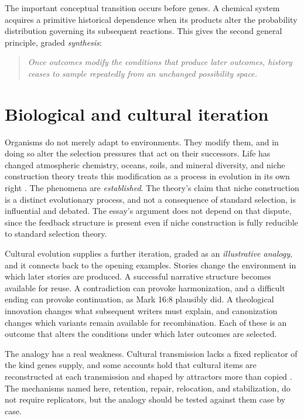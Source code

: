 \documentclass[11pt]{article}
\newenvironment{principle}{\begin{quote}\itshape}{\end{quote}}
\begin{document}
The important conceptual transition occurs before genes. A chemical system acquires a primitive historical dependence when its products alter the probability distribution governing its subsequent reactions. This gives the second general principle, graded \emph{synthesis}:
\begin{principle}
Once outcomes modify the conditions that produce later outcomes, history ceases to sample repeatedly from an unchanged possibility space.
\end{principle}

\section{Biological and cultural iteration}

Organisms do not merely adapt to environments. They modify them, and in doing so alter the selection pressures that act on their successors. Life has changed atmospheric chemistry, oceans, soils, and mineral diversity, and niche construction theory treats this modification as a process in evolution in its own right \cite{oslf}. The phenomena are \emph{established}. The theory's claim that niche construction is a distinct evolutionary process, and not a consequence of standard selection, is influential and debated. The essay's argument does not depend on that dispute, since the feedback structure is present even if niche construction is fully reducible to standard selection theory.

Cultural evolution supplies a further iteration, graded as an \emph{illustrative analogy}, and it connects back to the opening examples. Stories change the environment in which later stories are produced. A successful narrative structure becomes available for reuse. A contradiction can provoke harmonization, and a difficult ending can provoke continuation, as Mark 16:8 plausibly did. A theological innovation changes what subsequent writers must explain, and canonization changes which variants remain available for recombination. Each of these is an outcome that alters the conditions under which later outcomes are selected.

The analogy has a real weakness. Cultural transmission lacks a fixed replicator of the kind genes supply, and some accounts hold that cultural items are reconstructed at each transmission and shaped by attractors more than copied \cite{sperber}. The mechanisms named here, retention, repair, relocation, and stabilization, do not require replicators, but the analogy should be tested against them case by case.
\end{document}
